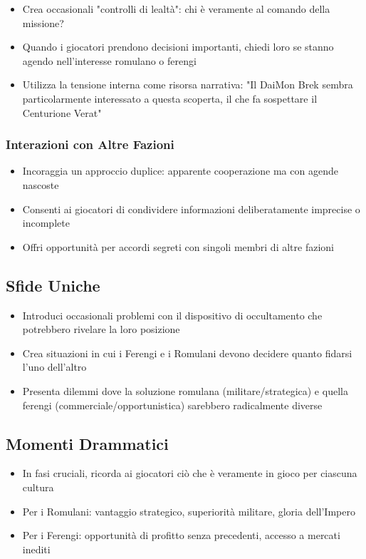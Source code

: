 \documentclass[letterpaper,twocolumn,openany,nodeprecatedcode]{dndbook}
\begin{document}
\begin{itemize}
    \item Crea occasionali "controlli di lealtà": chi è veramente al comando della missione?
    \item Quando i giocatori prendono decisioni importanti, chiedi loro se stanno agendo nell'interesse romulano o ferengi
    \item Utilizza la tensione interna come risorsa narrativa: "Il DaiMon Brek sembra particolarmente interessato a questa scoperta, il che fa sospettare il Centurione Verat"
\end{itemize}

\subsubsection{Interazioni con Altre Fazioni}

\begin{itemize}
    \item Incoraggia un approccio duplice: apparente cooperazione ma con agende nascoste
    \item Consenti ai giocatori di condividere informazioni deliberatamente imprecise o incomplete
    \item Offri opportunità per accordi segreti con singoli membri di altre fazioni
\end{itemize}

\subsection{Sfide Uniche}

\begin{itemize}
    \item Introduci occasionali problemi con il dispositivo di occultamento che potrebbero rivelare la loro posizione
    \item Crea situazioni in cui i Ferengi e i Romulani devono decidere quanto fidarsi l'uno dell'altro
    \item Presenta dilemmi dove la soluzione romulana (militare/strategica) e quella ferengi (commerciale/opportunistica) sarebbero radicalmente diverse
\end{itemize}

\subsection{Momenti Drammatici}

\begin{itemize}
    \item In fasi cruciali, ricorda ai giocatori ciò che è veramente in gioco per ciascuna cultura
    \item Per i Romulani: vantaggio strategico, superiorità militare, gloria dell'Impero
    \item Per i Ferengi: opportunità di profitto senza precedenti, accesso a mercati inediti
 
\end{itemize}
\end{document}
